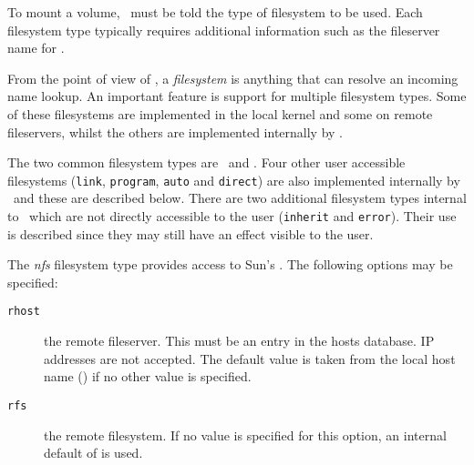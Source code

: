 %
%
%
%


\label{filesystems}

To mount a volume, \amd\ must be told the type of filesystem to be used.
Each filesystem type typically requires additional information such as the fileserver
name for \NFS.

From the point of view of \amd, a {\em filesystem} is anything
that can resolve an incoming name lookup.
An important feature is support for multiple filesystem types.
Some of these filesystems are implemented in
the local kernel and some on remote fileservers, whilst the others are implemented
internally by \amd.

The two common filesystem types are \UFS\ and \NFS.
Four other user accessible filesystems ({\tt link}, {\tt program}, {\tt auto}
and {\tt direct}) are also implemented
internally by \amd\ and these are described below.
There are two additional filesystem
types internal to \amd\ which are not directly accessible
to the user ({\tt inherit} and {\tt error}).  Their use is described since they may
still have an effect visible to the user.


The {\em nfs} filesystem type provides access to Sun's \NFS.
The following options may be specified:
\begin{description}
\item[\tt rhost]
the remote fileserver.  This must be an entry in the hosts database.
IP addresses \cite{rfc:ip} are not accepted.
The default value is taken from the local host name ()
if no other value is specified.

\item[\tt rfs]
the remote filesystem.
If no value is specified for this option, an internal default of
 is used.

\end{description}

